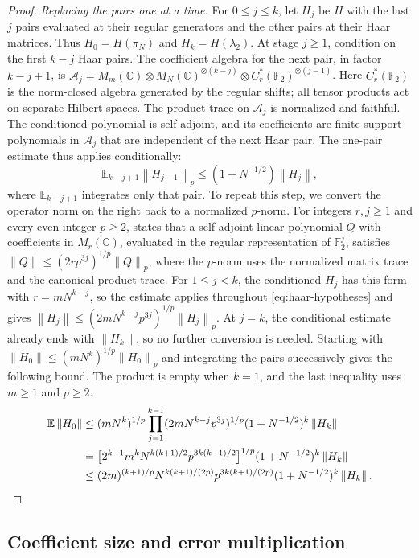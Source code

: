\documentclass[11pt]{article}
\numberwithin{equation}{section}
\theoremstyle{boldremark}\newtheorem{remark}[theorem]{Remark}
\newcommand{\C}{\mathbb C}
\newcommand{\F}{\mathbb F}
\newcommand{\E}{\mathbb E}
\newcommand{\M}{M}
\newcommand{\norm}[1]{\left\lVert #1\right\rVert}
\begin{document}
\begin{proof}
\emph{Replacing the pairs one at a time.}
For $0\le j\le k$, let $H_j$ be $H$ with the last $j$ pairs
evaluated at their regular generators and the other pairs at their
Haar matrices. Thus $H_0=H(\pi_N)$ and $H_k=H(\lambda_2)$.
At stage $j\ge1$, condition on the first $k-j$ Haar pairs.
The coefficient algebra for the next pair, in factor $k-j+1$, is
$\mathcal A_j=\M_m(\C)\otimes\M_N(\C)^{\otimes(k-j)}
\otimes C_r^*(\F_2)^{\otimes(j-1)}$. Here $C_r^*(\F_2)$ is the norm-closed algebra generated by the
regular shifts; all tensor products act on separate Hilbert spaces.
The product trace on $\mathcal A_j$ is normalized and faithful.
The conditioned polynomial is self-adjoint, and its coefficients are
finite-support polynomials in $\mathcal A_j$ that are independent of
the next Haar pair. The one-pair estimate thus applies conditionally:
\[
 \E_{k-j+1}\norm{H_{j-1}}_p
 \le(1+N^{-1/2})\norm{H_j},
\]
where $\E_{k-j+1}$ integrates only that pair.
To repeat this step, we convert the operator norm on the right back
to a normalized $p$-norm.
For integers $r,j\ge1$ and every even integer $p\ge2$,
\cite[Lemma~9.4]{BC} states that a self-adjoint linear polynomial
$Q$ with coefficients in $\M_r(\C)$, evaluated in the regular
representation of $\F_2^j$, satisfies
$\norm Q\le(2rp^{3j})^{1/p}\norm Q_p$, where the $p$-norm uses
the normalized matrix trace and the canonical product trace.
For $1\le j<k$, the conditioned $H_j$ has this form with
$r=mN^{k-j}$, so the estimate applies throughout
\eqref{eq:haar-hypotheses} and gives
$\norm{H_j}\le(2mN^{k-j}p^{3j})^{1/p}\norm{H_j}_p$. At $j=k$, the conditional estimate already ends with
$\norm{H_k}$, so no further conversion is needed.
Starting with $\norm{H_0}\le(mN^k)^{1/p}\norm{H_0}_p$ and
integrating the pairs successively gives the following bound.
The product is empty when $k=1$, and the last inequality uses
$m\ge1$ and $p\ge2$.
\begin{align*}
 \E\norm{H_0}
 &\le(mN^k)^{1/p}
     \prod_{j=1}^{k-1}(2mN^{k-j}p^{3j})^{1/p}
     (1+N^{-1/2})^k\norm{H_k}\\
 &=\bigl[2^{k-1}m^kN^{k(k+1)/2}p^{3k(k-1)/2}\bigr]^{1/p}
      (1+N^{-1/2})^k\norm{H_k}\\
 &\le(2m)^{(k+1)/p}N^{k(k+1)/(2p)}
     p^{3k(k+1)/(2p)}(1+N^{-1/2})^k\norm{H_k}.
 \qedhere
\end{align*}
\end{proof}

\subsection{Coefficient size and error multiplication}
\label{app:reduction-costs}
\end{document}
